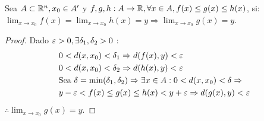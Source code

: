 \begin{theorem}
  Sea $A \subset \mathbb{R}^n, x_0 \in A^{\prime}$ y $f, g, h: A \to \mathbb{R}, \forall x \in A, f(x) \leq g(x) \leq h(x)$, si: \\
  $\lim_{x \to x_0} f(x) = \lim_{x \to x_0} h(x) = y \Rightarrow \lim_{x \to x_0} g(x) = y$.
  \begin{proof}
    Dado $\varepsilon > 0, \exists \delta_1, \delta_2 > 0$ :
    \begin{align*}
       & 0 < d(x, x_0) < \delta_1 \Rightarrow d(f(x), y) < \varepsilon                                                                 \\
       & 0 < d(x, x_0) < \delta_2 \Rightarrow d(h(x), y) < \varepsilon                                                                 \\
       & \text{Sea } \delta = \text{min}(\delta_1, \delta_2) \Rightarrow \exists x \in A : 0 < d(x, x_0) < \delta \Rightarrow \\
       & y - \varepsilon < f(x) \leq g(x) \leq h(x) < y + \varepsilon \Rightarrow d(g(x), y) < \varepsilon
    \end{align*}
    $\therefore \lim_{x \to x_0} g(x) = y$.
  \end{proof}
\end{theorem}

